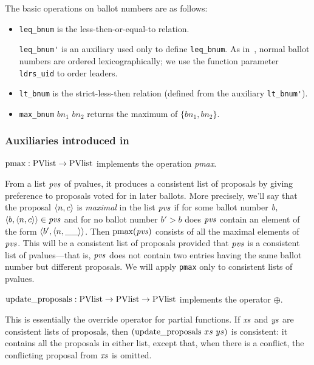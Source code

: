 \documentclass[final]{article}
\newcommand{\listinline}[1]{\text{\lstinline{#1}}}
\begin{document}
The basic operations on ballot numbers are as follows:
\begin{itemize}
\item
\lstinline{leq_bnum} is the less-then-or-equal-to relation.

\lstinline{leq_bnum'} is an auxiliary used only to define
\lstinline{leq_bnum}.  As in~\cite{VanRenesse:2011}, normal ballot
numbers are ordered lexicographically; we use the function parameter
\lstinline{ldrs_uid} to order leaders.

\item
\lstinline{lt_bnum} is the strict-less-then relation (defined from the
auxiliary \lstinline{lt_bnum'}).

\item
\lstinline{max_bnum} $bn_1$ $bn_2$ returns the maximum of $\{bn_1,bn_2\}$.
\end{itemize}

\subsubsection{Auxiliaries introduced in~\cite{VanRenesse:2011}}
\label{auxiliaries-from-paper}

$\listinline{pmax}:\NUPRLarrow{\listinline{PVlist}}{\listinline{PVlist}}$
implements the operation \emph{pmax}.

\vspace{1.0ex}
%
From a list $\mathit{pvs}$ of pvalues, it produces a consistent list of
proposals by giving preference to proposals voted for in later
ballots.  More precisely, we'll say that the proposal
$\langle n,c\rangle$ is \emph{maximal} in the list $\mathit{pvs}$ if for
some ballot number $\mathit{b},$
$\langle b,\langle n,c\rangle\rangle\in{}\mathit{pvs}$ and for no ballot
number $b' > b$ does $\mathit{pvs}$ contain an element of the form
$\langle b',\langle n,\_\_\rangle\rangle$.  Then
$\listinline{pmax}(\NUPRL{pvs})$ consists of all the maximal elements
of $\mathit{pvs}$.  This will be a consistent list of proposals
provided that $\mathit{pvs}$ is a consistent list of pvalues---that is,
$\mathit{pvs}$ does not contain two entries having the same ballot
number but different proposals.  We will apply \lstinline{pmax} only
to consistent lists of pvalues.

\vspace{1.0ex}
\noindent
$\listinline{update_proposals}:\NUPRLarrow{\listinline{PVlist}}{\NUPRLarrow{\listinline{PVlist}}{\listinline{PVlist}}}$
implements the operator $\oplus$.

\vspace{1.0ex}
%
This is essentially the override operator for partial functions.  If
$\mathit{xs}$ and $\mathit{ys}$ are consistent lists of proposals, then
$(\listinline{update_proposals}~xs~ys)$ is consistent: it contains all
the proposals in either list, except that, when there is a conflict,
the conflicting proposal from $\mathit{xs}$ is omitted.
\end{document}
